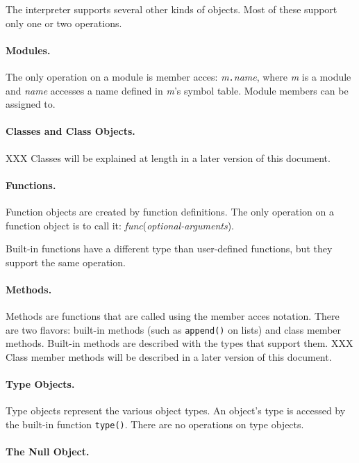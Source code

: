 The interpreter supports several other kinds of objects.
Most of these support only one or two operations.

\paragraph{Modules.}

The only operation on a module is member acces: {\em m}{\tt .}{\em name},
where {\em m} is a module and {\em name} accesses a name defined in
{\em m}'s symbol table.
Module members can be assigned to.

\paragraph{Classes and Class Objects.}

XXX Classes will be explained at length in a later version of this
document.

\paragraph{Functions.}

Function objects are created by function definitions.
The only operation on a function object is to call it:
{\em func}({\em optional-arguments}).

Built-in functions have a different type than user-defined functions,
but they support the same operation.

\paragraph{Methods.}

Methods are functions that are called using the member acces notation.
There are two flavors: built-in methods (such as {\tt append()} on
lists) and class member methods.
Built-in methods are described with the types that support them.
XXX Class member methods will be described in a later version of this
document.

\paragraph{Type Objects.}

Type objects represent the various object types.
An object's type is accessed by the built-in function
{\tt type()}.
There are no operations on type objects.

\paragraph{The Null Object.}


